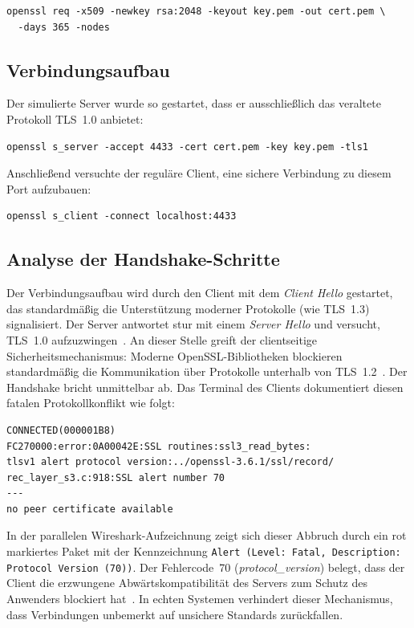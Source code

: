 \begin{lstlisting}[style=consolestyle]
openssl req -x509 -newkey rsa:2048 -keyout key.pem -out cert.pem \
  -days 365 -nodes
\end{lstlisting}

\subsection*{Verbindungsaufbau}
Der simulierte Server wurde so gestartet, dass er ausschließlich das veraltete Protokoll TLS~1.0 anbietet:

\begin{lstlisting}[style=consolestyle]
openssl s_server -accept 4433 -cert cert.pem -key key.pem -tls1
\end{lstlisting}

Anschließend versuchte der reguläre Client, eine sichere Verbindung zu diesem Port aufzubauen:

\begin{lstlisting}[style=consolestyle]
openssl s_client -connect localhost:4433
\end{lstlisting}

\subsection*{Analyse der Handshake-Schritte}

Der Verbindungsaufbau wird durch den Client mit dem \textit{Client Hello} gestartet, das standardmäßig die Unterstützung moderner Protokolle (wie TLS~1.3) signalisiert. Der Server antwortet stur mit einem \textit{Server Hello} und versucht, TLS~1.0 aufzuzwingen~\cite{ssldragon}. An dieser Stelle greift der clientseitige Sicherheitsmechanismus: Moderne OpenSSL-Bibliotheken blockieren standardmäßig die Kommunikation über Protokolle unterhalb von TLS~1.2~\cite{openssl}. Der Handshake bricht unmittelbar ab. Das Terminal des Clients dokumentiert diesen fatalen Protokollkonflikt wie folgt:

\begin{lstlisting}
CONNECTED(000001B8)
FC270000:error:0A00042E:SSL routines:ssl3_read_bytes:
tlsv1 alert protocol version:../openssl-3.6.1/ssl/record/
rec_layer_s3.c:918:SSL alert number 70
---
no peer certificate available
\end{lstlisting}

In der parallelen Wireshark-Aufzeichnung zeigt sich dieser Abbruch durch ein rot markiertes Paket mit der Kennzeichnung \texttt{Alert (Level: Fatal, Description: Protocol Version (70))}. Der Fehlercode~70 (\textit{protocol\_version}) belegt, dass der Client die erzwungene Abwärtskompatibilität des Servers zum Schutz des Anwenders blockiert hat~\cite{alertcode70}. In echten Systemen verhindert dieser Mechanismus, dass Verbindungen unbemerkt auf unsichere Standards zurückfallen.

